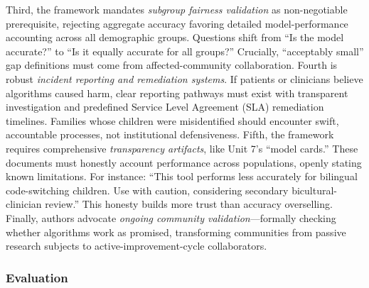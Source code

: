 \documentclass[11pt,twoside]{article}
\begin{document}
Third, the framework mandates \textit{subgroup fairness validation} as non-negotiable prerequisite, rejecting aggregate accuracy favoring detailed model-performance accounting across all demographic groups. Questions shift from ``Is the model accurate?'' to ``Is it equally accurate for all groups?'' Crucially, ``acceptably small'' gap definitions must come from affected-community collaboration. Fourth is robust \textit{incident reporting and remediation systems}. If patients or clinicians believe algorithms caused harm, clear reporting pathways must exist with transparent investigation and predefined Service Level Agreement (SLA) remediation timelines. Families whose children were misidentified should encounter swift, accountable processes, not institutional defensiveness. Fifth, the framework requires comprehensive \textit{transparency artifacts}, like Unit 7's ``model cards.'' These documents must honestly account performance across populations, openly stating known limitations. For instance: ``This tool performs less accurately for bilingual code-switching children. Use with caution, considering secondary bicultural-clinician review.'' This honesty builds more trust than accuracy overselling. Finally, authors advocate \textit{ongoing community validation}---formally checking whether algorithms work as promised, transforming communities from passive research subjects to active-improvement-cycle collaborators.

\newpage

\subsubsection*{Evaluation}

\vspace{-0.3cm}
\end{document}
